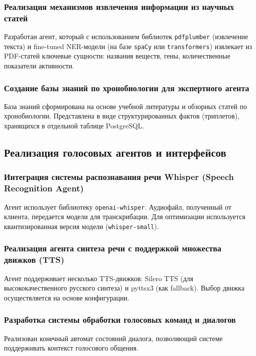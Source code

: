 \documentclass[a4paper,14pt]{extarticle}
\begin{document}
	\subsubsection{Реализация механизмов извлечения информации из научных статей}
	Разработан агент, который с использованием библиотек \texttt{pdfplumber} (извлечение текста) и fine-tuned NER-модели (на базе \texttt{spaCy} или \texttt{transformers}) извлекает из PDF-статей ключевые сущности: названия веществ, гены, количественные показатели активности.
	
	\subsubsection{Создание базы знаний по хронобиологии для экспертного агента}
	База знаний сформирована на основе учебной литературы и обзорных статей по хронобиологии. Представлена в виде структурированных фактов (триплетов), хранящихся в отдельной таблице PostgreSQL.
	
	\subsection{Реализация голосовых агентов и интерфейсов}
	
	\subsubsection{Интеграция системы распознавания речи Whisper (Speech Recognition Agent)}
	Агент использует библиотеку \texttt{openai-whisper}. Аудиофайл, полученный от клиента, передается модели для транскрибации. Для оптимизации используется квантизированная версия модели (\texttt{whisper-small}).
	
	\subsubsection{Реализация агента синтеза речи с поддержкой множества движков (TTS)}
	Агент поддерживает несколько TTS-движков: Silero TTS (для высококачественного русского синтеза) и pyttsx3 (как fallback). Выбор движка осуществляется на основе конфигурации.
	
	\subsubsection{Разработка системы обработки голосовых команд и диалогов}
	Реализован конечный автомат состояний диалога, позволяющий системе поддерживать контекст голосового общения.
	
\end{document}
